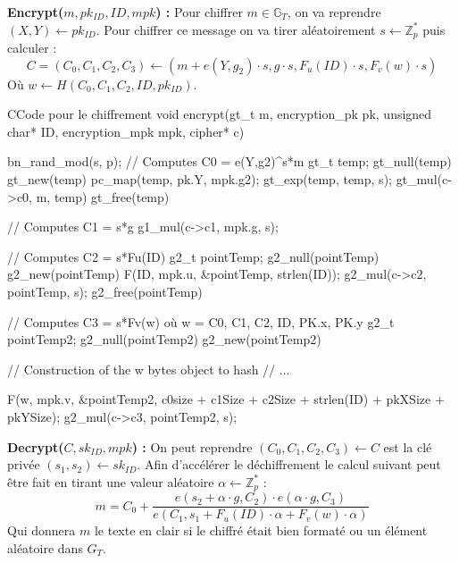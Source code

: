 \textbf{Encrypt($m, pk_{ID}, ID, mpk$) :} Pour chiffrer $m \in \mathbb{G}_T$, on va reprendre $(X,Y) \leftarrow pk_{ID}$. Pour chiffrer ce message on va tirer aléatoirement $s \leftarrow \mathbb{Z}_p^*$ puis calculer : 
\[C = (C_0, C_1, C_2, C_3) \leftarrow (m + e(Y, g_2) \cdot s, g \cdot s,F_u(ID) \cdot s, F_v(w) \cdot s )\]
Où $w \leftarrow H(C_0,C_1, C_2, ID, pk_{ID})$.

\begin{sourcebox}{C}{Code pour le chiffrement}
	void encrypt(gt_t m, encryption_pk pk, unsigned char* ID, encryption_mpk mpk, cipher* c){
		bn_rand_mod(s, p);
		// Computes C0 = e(Y,g2)^s*m
		gt_t temp;
		gt_null(temp)
		gt_new(temp)
		pc_map(temp, pk.Y, mpk.g2);
		gt_exp(temp, temp, s);
		gt_mul(c->c0, m, temp)
		gt_free(temp)
		
		// Computes C1 = s*g
		g1_mul(c->c1, mpk.g, s);
		
		// Computes C2 = s*Fu(ID)
		g2_t pointTemp;
		g2_null(pointTemp)
		g2_new(pointTemp)
		F(ID, mpk.u, &pointTemp, strlen(ID));
		g2_mul(c->c2, pointTemp, s);
		g2_free(pointTemp)
		
		// Computes C3 = s*Fv(w) où w = C0, C1, C2, ID, PK.x, PK.y
		g2_t pointTemp2;
		g2_null(pointTemp2)
		g2_new(pointTemp2)
		
		// Construction of the w bytes object to hash
		// ...
		
		F(w, mpk.v, &pointTemp2, c0size + c1Size + c2Size + strlen(ID) + pkXSize + pkYSize);
		g2_mul(c->c3, pointTemp2, s);
	}
\end{sourcebox}

\textbf{Decrypt($C, sk_{ID}, mpk$) :} On peut reprendre $(C_0,C_1,C_2,C_3) \leftarrow C$ est la clé privée $(s_1, s_2) \leftarrow sk_{ID}$. Afin d'accélérer le déchiffrement le calcul suivant peut être fait en tirant une valeur aléatoire $\alpha \leftarrow \mathbb{Z}_p^*$ :
\[m = C_0 + \frac{e(s_2 + \alpha \cdot g, C_2 ) \cdot e(\alpha \cdot g, C_3)}{e(C_1, s_1 + F_u(ID) \cdot \alpha + F_v(w) \cdot \alpha)}\]
Qui donnera $m$ le texte en clair si le chiffré était bien formaté ou un élément aléatoire dans $G_T$.

